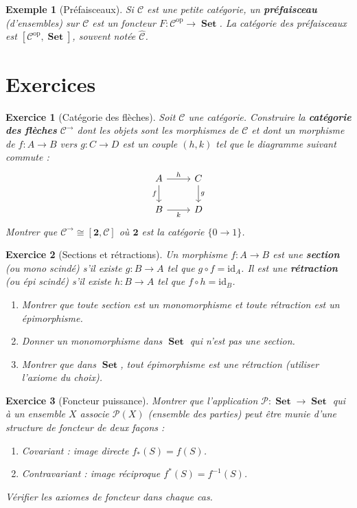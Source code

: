 \documentclass[a4paper,12pt]{book}
\DeclareMathOperator{\Set}{\mathbf{Set}}
\newcommand{\op}{\mathrm{op}}
\newcommand{\id}{\mathrm{id}}
\newtheorem{exemple}[theoreme]{Exemple}
\newtheorem{exercice}{Exercice}[chapter]
\begin{document}
\begin{exemple}[Préfaisceaux]\label{ex:prefaisceaux}
Si $\mathcal{C}$ est une petite catégorie, un \textbf{préfaisceau} (d'ensembles) sur $\mathcal{C}$ est un foncteur $F : \mathcal{C}^{\op} \to \Set$. La catégorie des préfaisceaux est $[\mathcal{C}^{\op}, \Set]$, souvent notée $\widehat{\mathcal{C}}$.
\end{exemple}

\section{Exercices}

\begin{exercice}[Catégorie des flèches]\label{exo:cat-fleches}
Soit $\mathcal{C}$ une catégorie. Construire la \textbf{catégorie des flèches} $\mathcal{C}^{\to}$ dont les objets sont les morphismes de $\mathcal{C}$ et dont un morphisme de $f : A \to B$ vers $g : C \to D$ est un couple $(h, k)$ tel que le diagramme suivant commute :
\[
\begin{tikzcd}
  A \arrow[r, "h"] \arrow[d, "f"'] & C \arrow[d, "g"] \\
  B \arrow[r, "k"'] & D
\end{tikzcd}
\]
Montrer que $\mathcal{C}^{\to} \cong [\mathbf{2}, \mathcal{C}]$ où $\mathbf{2}$ est la catégorie $\{0 \to 1\}$.
\end{exercice}

\begin{exercice}[Sections et rétractions]\label{exo:section-retraction}
Un morphisme $f : A \to B$ est une \textbf{section} (ou mono scindé) s'il existe $g : B \to A$ tel que $g \circ f = \id_A$. Il est une \textbf{rétraction} (ou épi scindé) s'il existe $h : B \to A$ tel que $f \circ h = \id_B$.
\begin{enumerate}[label=(\alph*)]
  \item Montrer que toute section est un monomorphisme et toute rétraction est un épimorphisme.
  \item Donner un monomorphisme dans $\Set$ qui n'est pas une section.
  \item Montrer que dans $\Set$, tout épimorphisme est une rétraction (utiliser l'axiome du choix).
\end{enumerate}
\end{exercice}

\begin{exercice}[Foncteur puissance]\label{exo:foncteur-puissance}
Montrer que l'application $\mathcal{P} : \Set \to \Set$ qui à un ensemble $X$ associe $\mathcal{P}(X)$ (ensemble des parties) peut être munie d'une structure de foncteur de deux façons :
\begin{enumerate}[label=(\alph*)]
  \item Covariant : image directe $f_*(S) = f(S)$.
  \item Contravariant : image réciproque $f^*(S) = f^{-1}(S)$.
\end{enumerate}
Vérifier les axiomes de foncteur dans chaque cas.
\end{exercice}
\end{document}
